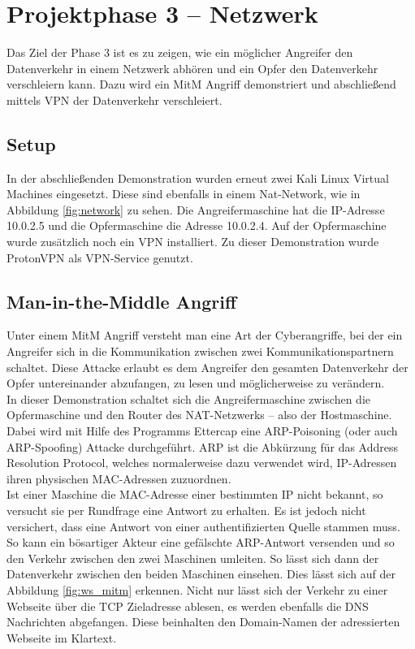 \chapter{Projektphase 3 – Netzwerk}
Das Ziel der Phase 3 ist es zu zeigen, wie ein möglicher Angreifer den Datenverkehr in einem Netzwerk abhören und ein Opfer den Datenverkehr verschleiern kann. Dazu wird ein \ac{MitM} Angriff demonstriert und abschließend mittels VPN der Datenverkehr verschleiert.
\section{Setup}
In der abschließenden Demonstration wurden erneut zwei Kali Linux Virtual Machines eingesetzt. Diese sind ebenfalls in einem Nat-Network, wie in Abbildung \ref{fig:network} zu sehen.
Die Angreifermaschine hat die IP-Adresse 10.0.2.5 und die Opfermaschine die Adresse 10.0.2.4. Auf der Opfermaschine wurde zusätzlich noch ein VPN installiert. Zu dieser Demonstration wurde ProtonVPN als VPN-Service genutzt. 
\section{Man-in-the-Middle Angriff}

Unter einem \ac{MitM} Angriff versteht man eine Art der Cyberangriffe, bei der ein Angreifer sich in die Kommunikation zwischen zwei Kommunikationspartnern schaltet. \cite{rapid7}
Diese Attacke erlaubt es dem Angreifer den gesamten Datenverkehr der Opfer untereinander abzufangen, zu lesen und möglicherweise zu verändern. \\
In dieser Demonstration schaltet sich die Angreifermaschine zwischen die Opfermaschine und den Router des NAT-Netzwerks – also der Hostmaschine. Dabei wird mit Hilfe des Programms Ettercap eine ARP-Poisoning (oder auch ARP-Spoofing) Attacke durchgeführt. 
ARP ist die Abkürzung für das Address Resolution Protocol, welches normalerweise dazu verwendet wird, IP-Adressen ihren physischen MAC-Adressen zuzuordnen. \\
Ist einer Maschine die MAC-Adresse einer bestimmten IP nicht bekannt, so versucht sie per Rundfrage eine Antwort zu erhalten. 
Es ist jedoch nicht versichert, dass eine Antwort von einer authentifizierten Quelle stammen muss. \cite{learning_center_2020}\\
So kann ein bösartiger Akteur eine gefälschte ARP-Antwort versenden und so den Verkehr zwischen den zwei Maschinen umleiten. 
So lässt sich dann der Datenverkehr zwischen den beiden Maschinen einsehen. Dies lässt sich auf der Abbildung \ref{fig:ws_mitm} erkennen. Nicht nur lässt sich der Verkehr zu einer Webseite über die TCP Zieladresse ablesen, es werden ebenfalls die DNS Nachrichten abgefangen. Diese beinhalten den Domain-Namen der adressierten Webseite im Klartext. 

